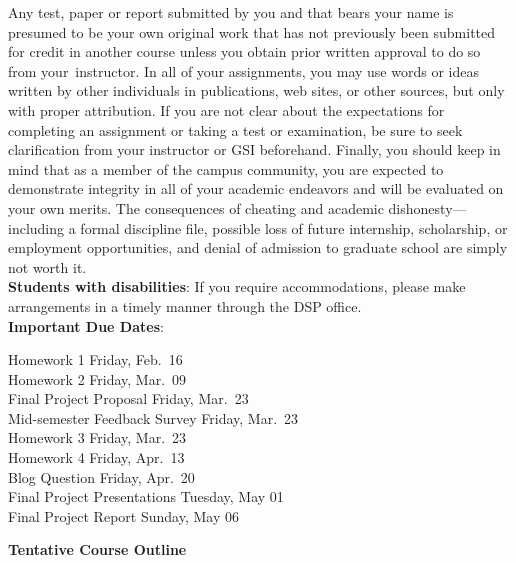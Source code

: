 \documentclass[11pt]{article}
\begin{document}
Any test, paper or report submitted by you and that bears your name is presumed
to be your own original work that has not previously been submitted for credit
in another course unless you obtain prior written approval to do so from
your instructor. In all of your assignments, you may use words or ideas written
by other individuals in publications, web sites, or other sources, but only with
proper attribution. If you are not clear about the expectations for completing
an assignment or taking a test or examination, be sure to seek clarification
from your instructor or GSI beforehand. Finally, you should keep in mind that as
a member of the campus community, you are expected to demonstrate integrity in
all of your academic endeavors and will be evaluated on your own merits. The
consequences of cheating and academic dishonesty—including a formal discipline
file, possible loss of future internship, scholarship, or employment
opportunities, and denial of admission to graduate school are simply not worth
it. \\

\textbf{Students with disabilities}: If you require accommodations, please make
arrangements in a timely manner through the DSP office.\\

\noindent\textbf{Important Due Dates}:
\begin{center} \begin{minipage}{5in}
\begin{flushleft}
Homework 1 \dotfill Friday, Feb.~16\\
Homework 2 \dotfill Friday, Mar.~09\\
Final Project Proposal \dotfill Friday, Mar.~23\\
Mid-semester Feedback Survey \dotfill Friday, Mar.~23\\
Homework 3 \dotfill Friday, Mar.~23\\
Homework 4 \dotfill Friday, Apr.~13\\
Blog Question \dotfill Friday, Apr.~20\\
Final Project Presentations \dotfill Tuesday, May 01\\
Final Project Report \dotfill Sunday, May 06\\
\end{flushleft}
\end{minipage}
\end{center}

\newpage

\textbf {\large Tentative Course Outline}
\end{document}
